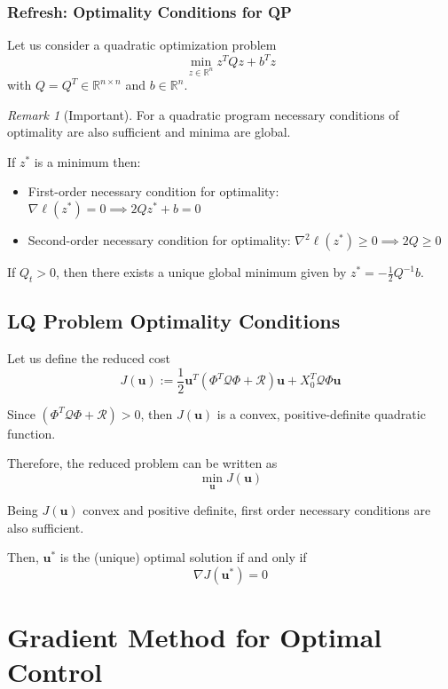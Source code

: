 \documentclass[openany]{book}
\theoremstyle{definition}
\theoremstyle{remark}
\newtheorem*{remark}{Remark}
\begin{document}
\subsection{Refresh: Optimality Conditions for QP}
Let us consider a quadratic optimization problem
\[
\min_{z\in\mathbb{R}^n} z^TQ z + b^T z
\]
with $Q = Q^T \in \mathbb{R}^{n\times n}$ and $b \in \mathbb{R}^n$.

\begin{remark}[Important]
For a quadratic program necessary conditions of optimality are also sufficient and minima are global.
\end{remark}

If $z^*$ is a minimum then:
\begin{itemize}
    \item First-order necessary condition for optimality: $\nabla\ell(z^*) = 0 \implies 2Q z^* + b = 0$
    \item Second-order necessary condition for optimality: $\nabla^2\ell(z^*) \geq 0 \implies 2Q \geq 0$
\end{itemize}

If $Q_t > 0$, then there exists a unique global minimum given by $z^* = -\frac{1}{2}Q^{-1}b$.

\section{LQ Problem Optimality Conditions}

Let us define the reduced cost
\[
J(\mathbf{u}) := \frac{1}{2}\mathbf{u}^T(\Phi^T\mathcal{Q}\Phi + \mathcal{R})\mathbf{u} + X_0^T\mathcal{Q}\Phi\mathbf{u}
\]

Since $(\Phi^T\mathcal{Q}\Phi + \mathcal{R}) > 0$, then $J(\mathbf{u})$ is a convex, positive-definite quadratic function.

Therefore, the reduced problem can be written as
\[
\min_{\mathbf{u}} J(\mathbf{u})
\]

Being $J(\mathbf{u})$ convex and positive definite, first order necessary conditions are also sufficient.

Then, $\mathbf{u}^*$ is the (unique) optimal solution if and only if
\[
\nabla J(\mathbf{u}^*) = 0
\]



\chapter{Gradient Method for Optimal Control}
\end{document}
